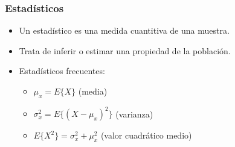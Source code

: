\begin{frame}











\end{frame}

\begin{frame}
  \frametitle{Estadísticos}
  \begin{itemize}
    \item Un estadístico es una medida cuantitiva de una muestra.
    \item Trata de inferir o estimar una propiedad de la población.
    \item Estadísticos frecuentes:
    \begin{itemize}
      \item $\mu_x=E\{X\}$ (media)
      \item $\sigma_x^2=E\{(X-\mu_x)^2\}$ (varianza)
      \item $E\{X^2\}=\sigma_x^2+\mu_x^2$ (valor cuadrático medio)
    \end{itemize}
  \end{itemize}
\end{frame}
  
